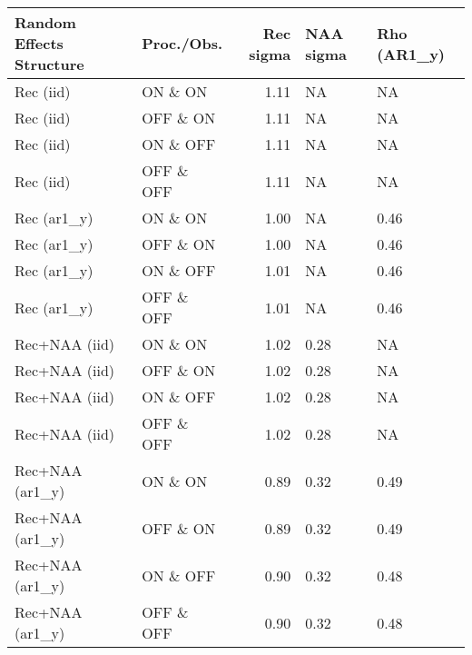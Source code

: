 \begin{table}[H]
    \centering
    \begin{tabular}{llrll}
        \toprule
         Random Effects Structure & Proc./Obs. & Rec sigma & NAA sigma & Rho (AR1\_y) \\
        \midrule
        Rec (iid)       & ON \& ON   & 1.11 & NA & NA \\
        Rec (iid)       & OFF \& ON  & 1.11 & NA & NA \\
        Rec (iid)       & ON \& OFF  & 1.11 & NA & NA \\
        Rec (iid)       & OFF \& OFF & 1.11 & NA & NA \\
        Rec (ar1\_y)    & ON \& ON   & 1.00 & NA & 0.46 \\
        Rec (ar1\_y)    & OFF \& ON  & 1.00 & NA & 0.46 \\
        Rec (ar1\_y)    & ON \& OFF  & 1.01 & NA & 0.46 \\
        Rec (ar1\_y)    & OFF \& OFF & 1.01 & NA & 0.46 \\
        Rec+NAA (iid)     & ON \& ON   & 1.02 & 0.28 & NA \\
        Rec+NAA (iid)     & OFF \& ON  & 1.02 & 0.28 & NA \\
        Rec+NAA (iid)     & ON \& OFF  & 1.02 & 0.28 & NA \\
        Rec+NAA (iid)     & OFF \& OFF & 1.02 & 0.28 & NA \\
        Rec+NAA (ar1\_y)  & ON \& ON   & 0.89 & 0.32 & 0.49 \\
        Rec+NAA (ar1\_y)  & OFF \& ON  & 0.89 & 0.32 & 0.49 \\
        Rec+NAA (ar1\_y)  & ON \& OFF  & 0.90 & 0.32 & 0.48 \\
        Rec+NAA (ar1\_y)  & OFF \& OFF & 0.90 & 0.32 & 0.48 \\
        \bottomrule
    \end{tabular}
\end{table}
